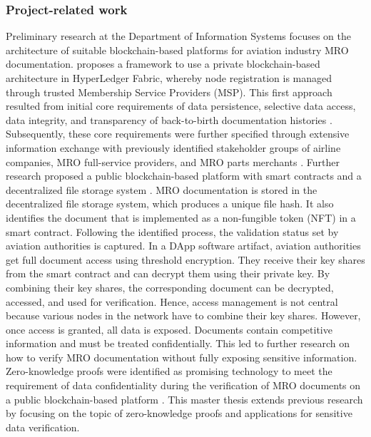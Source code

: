 \subsubsection{Project-related work}
Preliminary research at the Department of Information Systems focuses on the architecture of suitable blockchain-based platforms for aviation industry MRO documentation. \citet{WickboldtMeiseKliewer} proposes a framework to use a private blockchain-based architecture in HyperLedger Fabric, whereby node registration is managed through trusted Membership Service Providers (MSP). This first approach resulted from initial core requirements of data persistence, selective data access, data integrity, and transparency of back-to-birth documentation histories \citep{WickboldtClemens2018BzdD}. Subsequently, these core requirements were further specified through extensive information exchange with previously identified stakeholder groups of airline companies, MRO full-service providers, and MRO parts merchants \citep{ZedelJ}. Further research proposed a public blockchain-based platform with smart contracts and a decentralized file storage system \citep{ZedelJ}. MRO documentation is stored in the decentralized file storage system, which produces a unique file hash. It also identifies the document that is implemented as a non-fungible token (NFT) in a smart contract. Following the identified process, the validation status set by aviation authorities is captured. In a DApp software artifact, aviation authorities get full document access using threshold encryption. They receive their key shares from the smart contract and can decrypt them using their private key. By combining their key shares, the corresponding document can be decrypted, accessed, and used for verification. Hence, access management is not central because various nodes in the network have to combine their key shares. However, once access is granted, all data is exposed. Documents contain competitive information and must be treated confidentially. This led to further research on how to verify MRO documentation without fully exposing sensitive information. Zero-knowledge proofs were identified as promising technology to meet the requirement of data confidentiality during the verification of MRO documents on a public blockchain-based platform \citep{ZedelJ}. This master thesis extends previous research by focusing on the topic of zero-knowledge proofs and applications for sensitive data verification.

